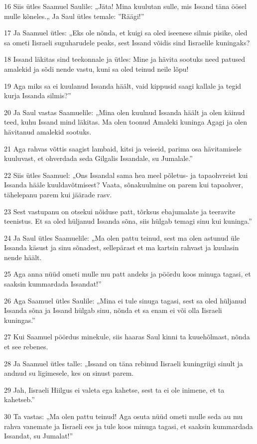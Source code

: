 \par 16 Siis ütles Saamuel Saulile: „Jäta! Mina kuulutan sulle, mis Issand täna öösel mulle kõneles.„ Ja Saul ütles temale: ”Räägi!”
\par 17 Ja Saamuel ütles: „Eks ole nõnda, et kuigi sa oled iseenese silmis pisike, oled sa ometi Iisraeli suguharudele peaks, sest Issand võidis sind Iisraelile kuningaks?
\par 18 Issand läkitas sind teekonnale ja ütles: Mine ja hävita sootuks need patused amalekid ja sõdi nende vastu, kuni sa oled teinud neile lõpu!
\par 19 Aga miks sa ei kuulanud Issanda häält, vaid kippusid saagi kallale ja tegid kurja Issanda silmis?”
\par 20 Ja Saul vastas Saamuelile: „Mina olen kuulnud Issanda häält ja olen käinud teed, kuhu Issand mind läkitas. Ma olen toonud Amaleki kuninga Agagi ja olen hävitanud amalekid sootuks.
\par 21 Aga rahvas võttis saagist lambaid, kitsi ja veiseid, parima osa hävitamisele kuuluvast, et ohverdada seda Gilgalis Issandale, su Jumalale.”
\par 22 Siis ütles Saamuel: „Ons Issandal sama hea meel põletus- ja tapaohvreist kui Issanda hääle kuuldavõtmisest? Vaata, sõnakuulmine on parem kui tapaohver, tähelepanu parem kui jäärade rasv.
\par 23 Sest vastupanu on otsekui nõiduse patt, tõrksus ebajumalate ja teeravite teenistus. Et sa oled hüljanud Issanda sõna, siis hülgab temagi sinu kui kuninga.”
\par 24 Ja Saul ütles Saamuelile: „Ma olen pattu teinud, sest ma olen astunud üle Issanda käsust ja sinu sõnadest, sellepärast et ma kartsin rahvast ja kuulasin nende häält.
\par 25 Aga anna nüüd ometi mulle mu patt andeks ja pöördu koos minuga tagasi, et saaksin kummardada Issandat!”
\par 26 Aga Saamuel ütles Saulile: „Mina ei tule sinuga tagasi, sest sa oled hüljanud Issanda sõna ja Issand hülgab sinu, nõnda et sa enam ei või olla Iisraeli kuningas.”
\par 27 Kui Saamuel pöördus minekule, siis haaras Saul kinni ta kuuehõlmast, nõnda et see rebenes.
\par 28 Ja Saamuel ütles talle: „Issand on täna rebinud Iisraeli kuningriigi sinult ja andnud su ligimesele, kes on sinust parem.
\par 29 Jah, Iisraeli Hiilgus ei valeta ega kahetse, sest ta ei ole inimene, et ta kahetseb.”
\par 30 Ta vastas: „Ma olen pattu teinud! Aga osuta nüüd ometi mulle seda au mu rahva vanemate ja Iisraeli ees ja tule koos minuga tagasi, et saaksin kummardada Issandat, su Jumalat!”
